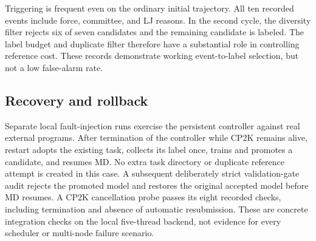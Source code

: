 Triggering is frequent even on the ordinary initial trajectory.
All ten recorded events include force, committee, and LJ reasons.
In the second cycle, the diversity filter rejects six of seven
candidates and the remaining candidate is labeled. The label budget
and duplicate filter therefore have a substantial role in controlling
reference cost. These records demonstrate working event-to-label
selection, but not a low false-alarm rate.

\subsection{Recovery and rollback}
Separate local fault-injection runs exercise the persistent controller
against real external programs. After termination of the controller
while CP2K remains alive, restart adopts the existing task, collects
its label once, trains and promotes a candidate, and resumes MD.
No extra task directory or duplicate reference attempt is created
in this case. A subsequent deliberately strict validation-gate audit
rejects the promoted model and restores the original accepted model
before MD resumes.
A CP2K cancellation probe passes its eight recorded checks, including
termination and absence of automatic resubmission. These are concrete
integration checks on the local five-thread backend, not evidence
for every scheduler or multi-node failure scenario.
